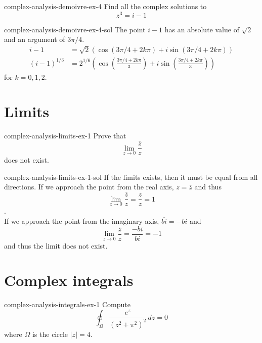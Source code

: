 \documentclass[preview]{standalone}
\begin{document}
\begin{snippetexercise}{complex-analysis-demoivre-ex-4}{}
    Find all the complex solutions to
    \[ z^3 = i-1 \]
\end{snippetexercise}

\begin{snippetsolution}{complex-analysis-demoivre-ex-4-sol}{}
    The point \(i-1\) has an absolute value of \(\sqrt{2}\)
    and an argument of \(3\pi/4\).
    \begin{align*}
        i-1 &= \sqrt{2} \left(
            \cos(3\pi/4 +2k\pi) + i\sin(3\pi/4 +2k\pi)
        \right) \\
        (i-1)^{1/3} &= 2^{1/6}
        \left(
            \cos\left( \frac{3\pi/4 + 2k\pi}{3} \right)
            + i \sin\left( \frac{3\pi/4 + 2k\pi}{3} \right)
        \right)
    \end{align*}
    for \(k=0,1,2\).
\end{snippetsolution}

\section{Limits}

\begin{snippetexercise}{complex-analysis-limits-ex-1}{}
    Prove that \[ \lim_{z \to 0} \dfrac{\overline{z}}{z} \]
    does not exist.
\end{snippetexercise}

\begin{snippetsolution}{complex-analysis-limits-ex-1-sol}{}
    If the limits exists, then it must be equal from all directions.
    If we approach the point from the real axis,
    \(z = \overline{z}\) and thus
    \[ \lim_{z \to 0} \dfrac{\overline{z}}{z} = \frac{z}{z} = 1 \]. \\
    If we approach the point from the imaginary axis,
    \( \overline{bi} = -bi \) and
    \[ \lim_{z \to 0} \dfrac{\overline{z}}{z} = \frac{-bi}{bi} = -1 \]
    and thus the limit does not exist.
\end{snippetsolution}

\section{Complex integrals}

\begin{snippetexercise}{complex-analysis-integrals-ex-1}{}
    Compute \[ \oint_\Omega \frac{e^z}{{(z^2 + \pi^2)}^2} \,dz = 0 \]
    where \(\Omega\) is the circle \(|z|=4\).
\end{snippetexercise}
\end{document}
